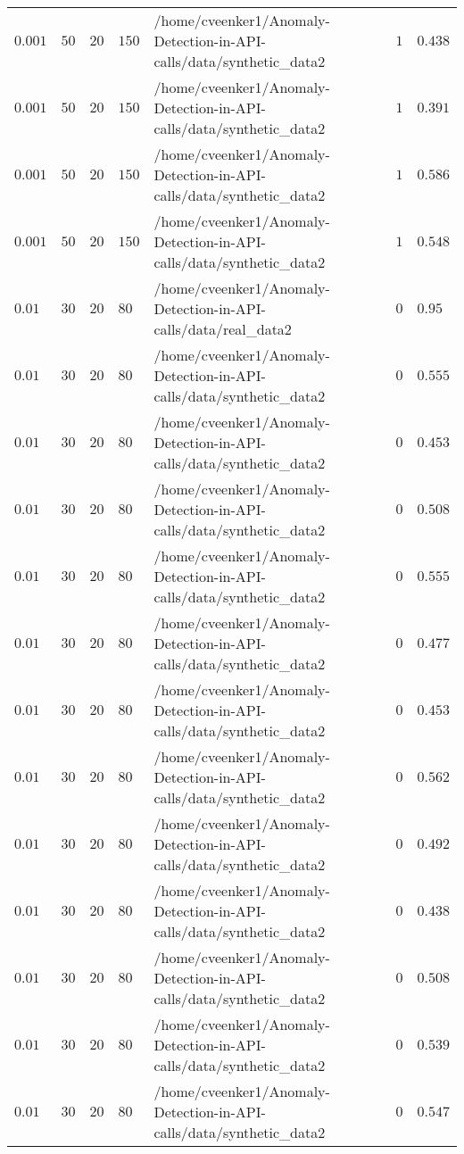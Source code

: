 \begin{table}[tbp]
\begin{tabular}{lllllll}
$0.001$ & $50$ & $20$ & $150$ & /home/cveenker1/Anomaly-Detection-in-API-calls/data/synthetic\_data2 & $1$ & $0.438$ \\
$0.001$ & $50$ & $20$ & $150$ & /home/cveenker1/Anomaly-Detection-in-API-calls/data/synthetic\_data2 & $1$ & $0.391$ \\
$0.001$ & $50$ & $20$ & $150$ & /home/cveenker1/Anomaly-Detection-in-API-calls/data/synthetic\_data2 & $1$ & $0.586$ \\
$0.001$ & $50$ & $20$ & $150$ & /home/cveenker1/Anomaly-Detection-in-API-calls/data/synthetic\_data2 & $1$ & $0.548$ \\
$0.01$ & $30$ & $20$ & $80$ & /home/cveenker1/Anomaly-Detection-in-API-calls/data/real\_data2 & $0$ & $0.95$ \\
$0.01$ & $30$ & $20$ & $80$ & /home/cveenker1/Anomaly-Detection-in-API-calls/data/synthetic\_data2 & $0$ & $0.555$ \\
$0.01$ & $30$ & $20$ & $80$ & /home/cveenker1/Anomaly-Detection-in-API-calls/data/synthetic\_data2 & $0$ & $0.453$ \\
$0.01$ & $30$ & $20$ & $80$ & /home/cveenker1/Anomaly-Detection-in-API-calls/data/synthetic\_data2 & $0$ & $0.508$ \\
$0.01$ & $30$ & $20$ & $80$ & /home/cveenker1/Anomaly-Detection-in-API-calls/data/synthetic\_data2 & $0$ & $0.555$ \\
$0.01$ & $30$ & $20$ & $80$ & /home/cveenker1/Anomaly-Detection-in-API-calls/data/synthetic\_data2 & $0$ & $0.477$ \\
$0.01$ & $30$ & $20$ & $80$ & /home/cveenker1/Anomaly-Detection-in-API-calls/data/synthetic\_data2 & $0$ & $0.453$ \\
$0.01$ & $30$ & $20$ & $80$ & /home/cveenker1/Anomaly-Detection-in-API-calls/data/synthetic\_data2 & $0$ & $0.562$ \\
$0.01$ & $30$ & $20$ & $80$ & /home/cveenker1/Anomaly-Detection-in-API-calls/data/synthetic\_data2 & $0$ & $0.492$ \\
$0.01$ & $30$ & $20$ & $80$ & /home/cveenker1/Anomaly-Detection-in-API-calls/data/synthetic\_data2 & $0$ & $0.438$ \\
$0.01$ & $30$ & $20$ & $80$ & /home/cveenker1/Anomaly-Detection-in-API-calls/data/synthetic\_data2 & $0$ & $0.508$ \\
$0.01$ & $30$ & $20$ & $80$ & /home/cveenker1/Anomaly-Detection-in-API-calls/data/synthetic\_data2 & $0$ & $0.539$ \\
$0.01$ & $30$ & $20$ & $80$ & /home/cveenker1/Anomaly-Detection-in-API-calls/data/synthetic\_data2 & $0$ & $0.547$ \\

\end{tabular}
\end{table}
